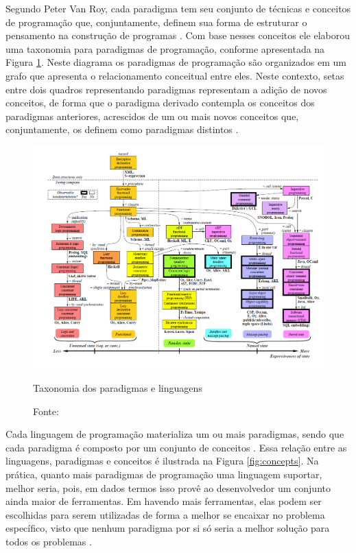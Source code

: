 Segundo Peter Van Roy, cada paradigma tem seu conjunto de técnicas e conceitos
de programação que, conjuntamente, definem sua forma de estruturar o pensamento
na construção de programas \cite{van_roy_2012}. Com base nesses conceitos ele
elaborou uma taxonomia para paradigmas de programação, conforme apresentada na
Figura \ref{fig:paradigmas_roy}. Neste diagrama os paradigmas de programação são
organizados em um grafo que apresenta o relacionamento conceitual entre eles.
Neste contexto, setas entre dois quadros representando paradigmas representam a
adição de novos conceitos, de forma que o paradigma derivado contempla os
conceitos dos paradigmas anteriores, acrescidos de um ou mais novos conceitos
que, conjuntamente, os definem como paradigmas distintos \cite{van_roy_2012}.

\begin{figure}[!htb]
  \centering
  \includegraphics[width=\textwidth, height=0.46\textheight]{../figures/taxonomia.png}
  \caption{Taxonomia dos paradigmas e linguagens}
  \caption*{Fonte: }
  \label{fig:paradigmas_roy}
\end{figure}

Cada linguagem de programação materializa um ou mais paradigmas, sendo que cada
paradigma é composto por um conjunto de conceitos \cite{van_roy_2012}. Essa
relação entre as linguagens, paradigmas e conceitos é ilustrada na Figura
\ref{fig:concepts}. Na prática, quanto mais paradigmas de programação uma
linguagem suportar, melhor seria, pois, em dados termos isso provê ao
desenvolvedor um conjunto ainda maior de ferramentas. Em havendo mais
ferramentas, elas podem ser escolhidas para serem utilizadas de forma a melhor
se encaixar no problema específico, visto que nenhum paradigma por si só seria a
melhor solução para todos os problemas \cite{van_roy_2004}.

